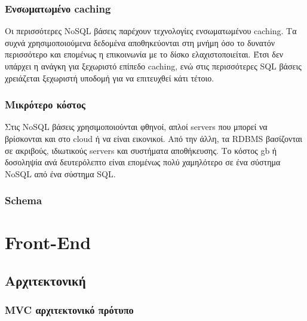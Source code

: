 		\subsubsection{Ενσωματωμένο caching}
		Οι περισσότερες NoSQL βάσεις παρέχουν τεχνολογίες ενσωματωμένου caching. Τα συχνά χρησιμοποιούμενα δεδομένα αποθηκεύονται στη μνήμη όσο το δυνατόν περισσότερο και επομένως η επικοινωνία με το δίσκο ελαχιστοποιείται. Έτσι δεν υπάρχει η ανάγκη για ξεχωριστό επίπεδο caching, ενώ στις περισσότερες SQL βάσεις χρειάζεται ξεχωριστή υποδομή για να επιτευχθεί κάτι τέτοιο\cite{stonebraker2010sql}.
		
		\subsubsection{Μικρότερο κόστος}
		Στις NoSQL βάσεις χρησιμοποιούνται φθηνοί, απλοί servers που μπορεί να βρίσκονται και στο cloud ή να είναι εικονικοί. Από την άλλη, τα RDBMS βασίζονται σε ακριβούς, ιδιωτικούς servers και συστήματα αποθήκευσης. Το κόστος gb ή δοσοληψία ανά δευτερόλεπτο είναι επομένως πολύ χαμηλότερο σε ένα σύστημα NoSQL από ένα σύστημα SQL\cite{stonebraker2010sql}.
	
		\subsubsection{Schema}

\section{Front-End}
	\subsection{Αρχιτεκτονική}
		\subsubsection{MVC αρχιτεκτονικό πρότυπο}\label{sssection:mvc}

